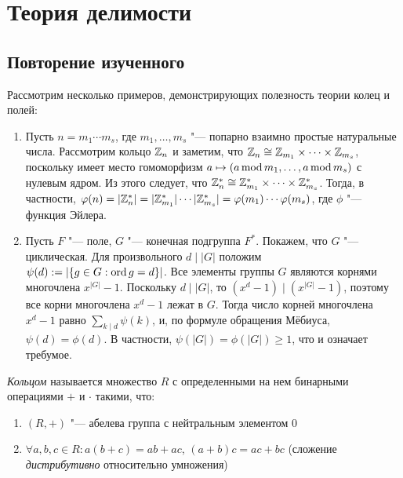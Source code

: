 \section{Теория делимости}

\subsection{Повторение изученного}

\begin{example}
	Рассмотрим несколько примеров, демонстрирующих полезность теории колец и полей:
	\begin{enumerate}
		\item Пусть $n = m_1 \dotsm m_s$, где $m_1, \dotsc, m_s$ "--- попарно взаимно простые натуральные числа. Рассмотрим кольцо $\mathbb{Z}_n$ и заметим, что $\mathbb{Z}_n \cong \mathbb{Z}_{m_1} \times \dotsb \times \mathbb{Z}_{m_s}$, поскольку имеет место гомоморфизм $a \mapsto (a \operatorname{mod} m_1, \dotsc, a \operatorname{mod} m_s)$ с нулевым ядром. Из этого следует, что $\mathbb{Z}_n^* \cong \mathbb{Z}_{m_1}^* \times \dotsb \times \mathbb{Z}_{m_s}^*$. Тогда, в частности, $\phi(n) =  |\Z_n^*| \hm= |\Z_{m_1}^*|\dotsm|\Z_{m_s}^*| \hm= \phi(m_1)\dotsm\phi(m_s)$, где $\phi$ "--- функция Эйлера.
		\item Пусть $F$ "--- поле, $G$ "--- конечная подгруппа $F^*$. Покажем, что $G$ "--- циклическая. Для произвольного $d\mid |G|$ положим $\psi(d) := |\{g \in G: \operatorname{ord}{g} = d\}|$. Все элементы группы $G$ являются корнями многочлена $x^{|G|} - 1$. Поскольку $d\mid |G|$, то $(x^{d} - 1) \mid (x^{|G|} - 1)$, поэтому все корни многочлена $x^d - 1$ лежат в $G$. Тогда число корней многочлена $x^d - 1$ равно $\sum_{k \mid d} \psi(k)$, и, по формуле обращения Мёбиуса, $\psi(d) = \phi(d)$. В частности, $\psi(|G|) = \phi(|G|) \ge 1$, что и означает требумое.
	\end{enumerate}
\end{example}

\begin{reminder}
	\textit{Кольцом} называется множество $R$ с определенными на нем бинарными операциями $+$ и $\cdot$ такими, что:
	\begin{enumerate}
		\item $(R, +)$ "--- абелева группа с нейтральным элементом 0
		\item $\forall a, b, c \in R: a(b + c) = ab + ac$, $(a + b)c = ac + bc$ (сложение \textit{дистрибутивно} относительно умножения)
	\end{enumerate}
\end{reminder}

